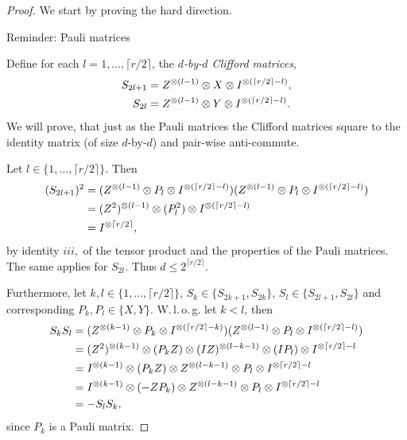 \begin{proof}
	We start by proving the hard direction. 
	
	Reminder: Pauli matrices
	
	Define for each $l=1,\dots,\lceil r/2\rceil$, the \emph{$d$-by-$d$ Clifford matrices},
	\begin{align}
		S_{2l+1} &= Z^{\otimes (l-1)} \otimes X \otimes I^{\otimes(\lceil r/2\rceil - l)},\\
		S_{2l} &= Z^{\otimes (l-1)} \otimes Y \otimes I^{\otimes(\lceil r/2\rceil - l)}.
	\end{align}
	We will prove, that just as the Pauli matrices the Clifford matrices square to the identity matrix (of size $d$-by-$d$) and pair-wise anti-commute. 

	Let $l\in\{1,\dots,\lceil r/2\rceil\}$. Then
	\begin{align*}
		(S_{2l+1})^2 &= (Z^{\otimes (l-1)} \otimes P_l \otimes I^{\otimes(\lceil r/2\rceil - l)}) (Z^{\otimes (l-1)} \otimes P_l \otimes I^{\otimes(\lceil r/2\rceil - l)}) \\
		&= (Z^2)^{\otimes (l-1)} \otimes (P_l^2) \otimes I^{\otimes (\lceil r/2 \rceil -l)} \\
		&= I^{\otimes \lceil r/2 \rceil},
	\end{align*}
	by identity $iii,$ of the tensor product and the properties of the Pauli matrices. The same applies for $S_{2l}$. Thus $d\leq 2^{\lceil r/2 \rceil}$.
	
	Furthermore, let $k,l\in\{1,\dots, \lceil r/2 \rceil\}$, $S_k\in\{S_{2k+1},S_{2k}\}$, $S_l\in\{S_{2l+1},S_{2l}\}$ and corresponding $P_k,P_l\in\{X,Y\}$. W.\,l.\,o.\,g. let $k<l$, then
	\begin{align*}
		S_{k}S_{l} &= (Z^{\otimes (k-1)} \otimes P_k \otimes I^{\otimes(\lceil r/2\rceil - k)})(Z^{\otimes (l-1)} \otimes P_l \otimes I^{\otimes(\lceil r/2\rceil - l)})\\
		&=(Z^2)^{\otimes (k-1)} \otimes (P_k Z) \otimes (I Z)^{\otimes (l-k-1)} \otimes (I P_l) \otimes I^{\otimes \lceil r/2\rceil -l} \\
		&= I^{\otimes (k-1)} \otimes (P_k Z) \otimes Z^{\otimes (l-k-1)} \otimes P_l \otimes I^{\otimes \lceil r/2\rceil -l}\\
		&= I^{\otimes (k-1)} \otimes (- Z P_k) \otimes Z^{\otimes (l-k-1)} \otimes P_l \otimes I^{\otimes \lceil r/2\rceil -l} \\
		&= - S_lS_k,
	\end{align*}
	since $P_k$ is a Pauli matrix.
	

\end{proof}
